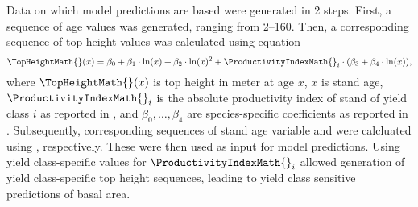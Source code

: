 Data on which model predictions are based were generated in 2 steps. First, a sequence of age values was generated, ranging from \SIrange{2}{160}{\year}.  Then, a corresponding sequence of top height values was calculated using equation
\begin{equation}
  \label{eq:NagelFunctionSolvedForTopHeight}
  \TopHeightMath{}(x) = \beta_0 + \beta_1 \cdot \ln(x) + \beta_2 \cdot \ln(x)^2 + \ProductivityIndexMath{}_i \cdot (\beta_3 + \beta_4 \cdot \ln(x)),
\end{equation}
where \(\TopHeightMath{}(x)\) is top height in meter at age \(x\), \(x\) is stand age, \(\ProductivityIndexMath{}_i\) is the absolute productivity index of stand of yield class \(i\) as reported in , and \(\beta_0, \ldots, \beta_4\) are species-specific coefficients as reported in  \parencite{Nagel1999}.  Subsequently, corresponding sequences of stand age variable and \ProductivityIndexVariableText{} were calcluated using , respectively.  These were then used as input for model predictions.  Using yield class-specific values for \(\ProductivityIndexMath{}_i\) allowed generation of yield class-specific top height sequences, leading to yield class sensitive predictions of basal area.  

